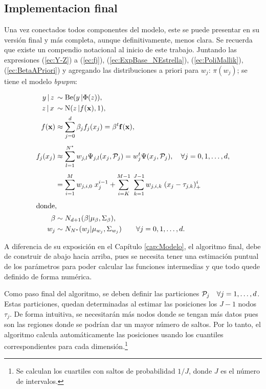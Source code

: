 \documentclass[../Main/Main.tex]{subfiles}
\begin{document}
\subsection{Implementacion final}
Una vez conectados todos componentes del modelo, este se puede presentar en su versión final y más completa, aunque definitivamente, menos clara. Se recuerda que existe un compendio notacional al inicio de este trabajo. Juntando las expresiones (\ref{ec:Y-Z}) a (\ref{ec:fj}), (\ref{ec:ExpBase_NEstrella}), (\ref{ec:PoliMallik}), (\ref{ec:BetaAPriori}) y agregando las distribuciones a priori para $w_j$: $\pi(w_j)$; se tiene el modelo \textit{bpwpm}:

\begin{align}
	y\,|\,z\, &\sim \text{Be}(y\,|\Phi(z)), \nonumber\\ 
	z\,|\,x\, &\sim \text{N}(z\,|f(\xsn),1),\nonumber \\
	f(\xsn) &\approx \sum_{j=0}^d \beta_j f_j(x_j) 
			= \beta^t\fsn(\xsn),  \nonumber\\[4pt]	
	f_j(x_j)&\approx \sum_{l = 1}^{\N} w_{j,l} \Psi_{j,l}(x_j, \mathcal{P}_j) 
			=  w_j^t\Psi(x_j,\P_j), \quad \forall j= 0,1,\ldots,d,	\nonumber\\[4pt]
 		 	&=	\sum_{i = 1}^M w_{j,i,0} \; x_j^{i-1} + 
			\sum_{i = K}^{M-1} \;
	 		\sum_{k = 1}^{J-1}w_{j,i,k}\;(x_j - \t_{j,k})_+^{i} 
			\nonumber \\[4pt]
	\intertext{donde,}
	 		\beta &\sim N_{d+1}(\beta|\mu_{\beta}, \Sigma_{\beta}),	\nonumber \\
	w_j  &\sim N_{\N}(w_j|\mu_{w_j},\Sigma_{w_j}) \quad\quad \forall j= 0,1,\ldots,d. \label{ec:ModBPWPM}	
\end{align}

A diferencia de su exposición en el Capítulo \ref{cap:Modelo}, el algoritmo final, debe de construir de abajo hacia arriba, pues se necesita tener una estimación puntual de los parámetros para poder calcular las funciones intermedias y que todo quede definido de forma numérica.

Como paso final del algoritmo, se deben definir las particiones $\P_j \quad \forall j= 1,\ldots,d$. Estas particiones, quedan determinadas al estimar las posiciones los $J-1$ nodos $\tau_j$. De forma intuitiva, se necesitarán más nodos donde se tengan más datos pues son las regiones donde se podrían dar un mayor número de saltos. Por lo tanto, el algoritmo calcula automáticamente las posiciones usando los cuantiles correspondientes para cada dimensión.\footnote{Se calculan los cuartiles con saltos de probabilidad $1/J$, donde $J$ es el número de intervalos.} 
\end{document}
